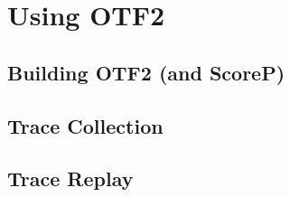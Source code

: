 
\section{Using OTF2}
\label{sec:tutorial:otf}

\subsection{Building OTF2 (and ScoreP)}
\label{subset:otf:build}

\subsection{Trace Collection}
\label{subsec:otf:traceCollection}

\subsection{Trace Replay}
\label{subsec:otf:traceReplay}

